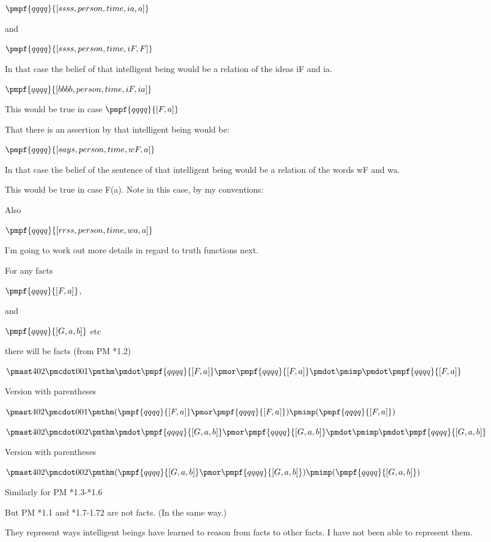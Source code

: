 \documentclass[12pt]{article}
\begin{document}
$\pmpf{qqqq}{[ssss, person, time, ia, a]}$

and

$\pmpf{qqqq}{[ssss, person, time, iF , F]} $

In that case the belief of that intelligent being would be a relation
of the ideas iF and ia.

$\pmpf{qqqq}{[bbbb, person, time, iF, ia]} $

This would be true in case $\pmpf{qqqq}{[F,a]}$

That there is an assertion by that intelligent being would be:

$\pmpf{qqqq}{[says, person, time, wF, a]}$

In that case the belief of the sentence of that intelligent being would
be a relation of the words wF and wa.

This would be true in case F(a).
Note in this case, by my conventions:

Also

$\pmpf{qqqq}{[rrss, person, time, wa, a]}$

I'm going to work out more details in regard to truth functions next.

For any facts 

$\pmpf{qqqq}{[F,a]}$,

and

$\pmpf{qqqq}{[G, a, b]}$
etc

there will be facts (from PM *1.2)

$\pmast 402 \pmcdot 001 \pmthm \pmdot \pmpf{qqqq}{[F,a]} \pmor \pmpf{qqqq}{[F,a]} \pmdot \pmimp \pmdot \pmpf{qqqq}{[F,a]}$
 
 

Version with parentheses

$\pmast 402 \pmcdot 001 \pmthm  (  \pmpf{qqqq}{[F,a]} \pmor \pmpf{qqqq}{[F,a]}  ) \pmimp (  \pmpf{qqqq}{[F,a]})$


$\pmast 402 \pmcdot 002 \pmthm \pmdot \pmpf {qqqq}{[G,a,b]} \pmor \pmpf{qqqq}{[G,a,b]} \pmdot \pmimp \pmdot \pmpf{qqqq}{[G,a,b]}$     
 
 

Version with parentheses

$\pmast 402 \pmcdot 002 \pmthm  (  \pmpf {qqqq}{[G,a,b]} \pmor \pmpf{qqqq}{[G,a,b]}  ) \pmimp (  \pmpf{qqqq}{[G,a,b]}     )$


Similarly for PM *1.3-*1.6

But PM *1.1 and *1.7-1.72 are not facts. (In the same way.)

They represent ways intelligent beings have learned to
reason from facts to other facts. I have not been able to represent them.
\end{document}
